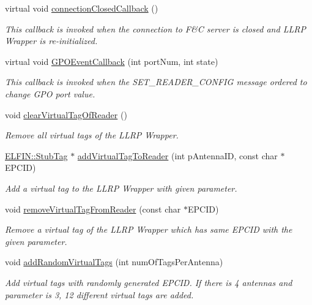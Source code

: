 \begin{DoxyCompactItemize}
virtual void \hyperlink{class_e_l_f_i_n_1_1_stub_reader_app_a772915f831ab5504f76f03cdd9eac65c}{connection\-Closed\-Callback} ()
\begin{DoxyCompactList}\small\item\em This callback is invoked when the connection to F\&C server is closed and L\-L\-R\-P Wrapper is re-\/initialized. \end{DoxyCompactList}\item 
virtual void \hyperlink{class_e_l_f_i_n_1_1_stub_reader_app_a4cf4f7c31e213da02eab0905c78dd0b1}{G\-P\-O\-Event\-Callback} (int port\-Num, int state)
\begin{DoxyCompactList}\small\item\em This callback is invoked when the S\-E\-T\-\_\-\-R\-E\-A\-D\-E\-R\-\_\-\-C\-O\-N\-F\-I\-G message ordered to change G\-P\-O port value. \end{DoxyCompactList}\item 
void \hyperlink{class_e_l_f_i_n_1_1_stub_reader_app_a9f95210c0b1316d3c296b1f2d974dd41}{clear\-Virtual\-Tag\-Of\-Reader} ()
\begin{DoxyCompactList}\small\item\em Remove all virtual tags of the L\-L\-R\-P Wrapper. \end{DoxyCompactList}\item 
\hyperlink{class_e_l_f_i_n_1_1_stub_tag}{E\-L\-F\-I\-N\-::\-Stub\-Tag} $\ast$ \hyperlink{class_e_l_f_i_n_1_1_stub_reader_app_a54b75fc44c267ad96e8e4f0a20681065}{add\-Virtual\-Tag\-To\-Reader} (int p\-Antenna\-I\-D, const char $\ast$E\-P\-C\-I\-D)
\begin{DoxyCompactList}\small\item\em Add a virtual tag to the L\-L\-R\-P Wrapper with given parameter. \end{DoxyCompactList}\item 
void \hyperlink{class_e_l_f_i_n_1_1_stub_reader_app_ae9b048735f277c916267213368f47de0}{remove\-Virtual\-Tag\-From\-Reader} (const char $\ast$E\-P\-C\-I\-D)
\begin{DoxyCompactList}\small\item\em Remove a virtual tag of the L\-L\-R\-P Wrapper which has same E\-P\-C\-I\-D with the given parameter. \end{DoxyCompactList}\item 
void \hyperlink{class_e_l_f_i_n_1_1_stub_reader_app_a6aa69e9301dd6e009a6c2beef51b5fae}{add\-Random\-Virtual\-Tags} (int num\-Of\-Tags\-Per\-Antenna)
\begin{DoxyCompactList}\small\item\em Add virtual tags with randomly generated E\-P\-C\-I\-D. If there is 4 antennas and parameter is 3, 12 different virtual tags are added. \end{DoxyCompactList}\item 

\end{DoxyCompactItemize}
